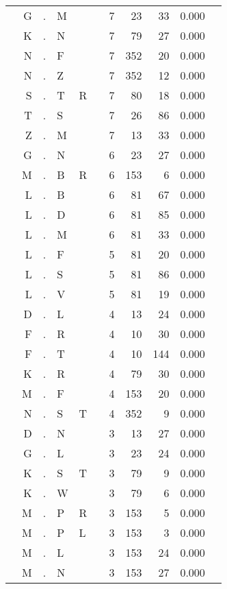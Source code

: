 \begin{longtable}{r@{ } r@{ } c@{ } l@{ } l@{ } l@{ } r r r r l }
  & G & . & M &   &   & 7 & 23 & 33 & 0.000 &  \\
  & K & . & N &   &   & 7 & 79 & 27 & 0.000 &  \\
  & N & . & F &   &   & 7 & 352 & 20 & 0.000 &  \\
  & N & . & Z &   &   & 7 & 352 & 12 & 0.000 &  \\
  & S & . & T & R &   & 7 & 80 & 18 & 0.000 &  \\
  & T & . & S &   &   & 7 & 26 & 86 & 0.000 &  \\
  & Z & . & M &   &   & 7 & 13 & 33 & 0.000 &  \\
  & G & . & N &   &   & 6 & 23 & 27 & 0.000 &  \\
  & M & . & B & R &   & 6 & 153 & 6 & 0.000 &  \\
  & L & . & B &   &   & 6 & 81 & 67 & 0.000 &  \\
  & L & . & D &   &   & 6 & 81 & 85 & 0.000 &  \\
  & L & . & M &   &   & 6 & 81 & 33 & 0.000 &  \\
  & L & . & F &   &   & 5 & 81 & 20 & 0.000 &  \\
  & L & . & S &   &   & 5 & 81 & 86 & 0.000 &  \\
  & L & . & V &   &   & 5 & 81 & 19 & 0.000 &  \\
  & D & . & L &   &   & 4 & 13 & 24 & 0.000 &  \\
  & F & . & R &   &   & 4 & 10 & 30 & 0.000 &  \\
  & F & . & T &   &   & 4 & 10 & 144 & 0.000 &  \\
  & K & . & R &   &   & 4 & 79 & 30 & 0.000 &  \\
  & M & . & F &   &   & 4 & 153 & 20 & 0.000 &  \\
  & N & . & S & T &   & 4 & 352 & 9 & 0.000 &  \\
  & D & . & N &   &   & 3 & 13 & 27 & 0.000 &  \\
  & G & . & L &   &   & 3 & 23 & 24 & 0.000 &  \\
  & K & . & S & T &   & 3 & 79 & 9 & 0.000 &  \\
  & K & . & W &   &   & 3 & 79 & 6 & 0.000 &  \\
  & M & . & P & R &   & 3 & 153 & 5 & 0.000 &  \\
  & M & . & P & L &   & 3 & 153 & 3 & 0.000 &  \\
  & M & . & L &   &   & 3 & 153 & 24 & 0.000 &  \\
  & M & . & N &   &   & 3 & 153 & 27 & 0.000 &  \\

\end{longtable}
